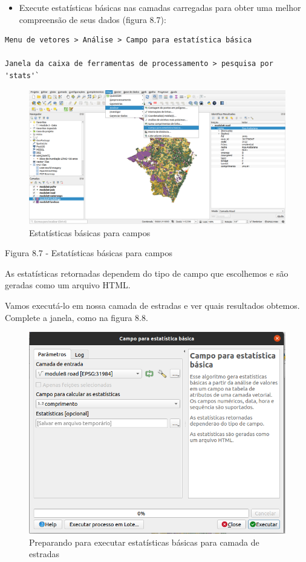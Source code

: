 \documentclass[
  portuguese,
]{krantz}
\providecommand{\tightlist}{%
  \setlength{\itemsep}{0pt}\setlength{\parskip}{0pt}}
\begin{document}
\begin{itemize}
\tightlist
\item
  Execute estatísticas básicas nas camadas carregadas para obter uma melhor compreensão de seus dados (figura 8.7):
\end{itemize}

\begin{verbatim}
Menu de vetores > Análise > Campo para estatística básica

Janela da caixa de ferramentas de processamento > pesquisa por 'stats'`
\end{verbatim}

\begin{figure}
\centering
\includegraphics{media/modulo8/fig87.png}
\caption{Estatísticas básicas para campos}
\end{figure}

Figura 8.7 - Estatísticas básicas para campos

As estatísticas retornadas dependem do tipo de campo que escolhemos e são geradas como um arquivo HTML.

Vamos executá-lo em nossa camada de estradas e ver quais resultados obtemos. Complete a janela, como na figura 8.8.

\begin{figure}
\centering
\includegraphics{media/modulo8/fig88.png}
\caption{Preparando para executar estatísticas básicas para camada de estradas}
\end{figure}
\end{document}
